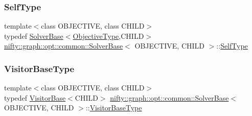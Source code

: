 \mbox{\label{classnifty_1_1graph_1_1opt_1_1common_1_1SolverBase_aeaf0e8eabef52cd3858e8c7bacc82dc6}} 
\subsubsection{\texorpdfstring{Self\+Type}{SelfType}}
{\footnotesize\ttfamily template$<$class O\+B\+J\+E\+C\+T\+I\+VE, class C\+H\+I\+LD$>$ \\
typedef \hyperlink{classnifty_1_1graph_1_1opt_1_1common_1_1SolverBase}{Solver\+Base}$<$\hyperlink{classnifty_1_1graph_1_1opt_1_1common_1_1SolverBase_aac4861a6201ba3df7ef66ad5af0c65bd}{Objective\+Type},C\+H\+I\+LD$>$ \hyperlink{classnifty_1_1graph_1_1opt_1_1common_1_1SolverBase}{nifty\+::graph\+::opt\+::common\+::\+Solver\+Base}$<$ O\+B\+J\+E\+C\+T\+I\+VE, C\+H\+I\+LD $>$\+::\hyperlink{classnifty_1_1graph_1_1opt_1_1common_1_1SolverBase_aeaf0e8eabef52cd3858e8c7bacc82dc6}{Self\+Type}}

\mbox{\label{classnifty_1_1graph_1_1opt_1_1common_1_1SolverBase_ad9932afb08dd17d375de4b15da9ffaa6}} 
\subsubsection{\texorpdfstring{Visitor\+Base\+Type}{VisitorBaseType}}
{\footnotesize\ttfamily template$<$class O\+B\+J\+E\+C\+T\+I\+VE, class C\+H\+I\+LD$>$ \\
typedef \hyperlink{classnifty_1_1graph_1_1opt_1_1common_1_1VisitorBase}{Visitor\+Base}$<$C\+H\+I\+LD$>$ \hyperlink{classnifty_1_1graph_1_1opt_1_1common_1_1SolverBase}{nifty\+::graph\+::opt\+::common\+::\+Solver\+Base}$<$ O\+B\+J\+E\+C\+T\+I\+VE, C\+H\+I\+LD $>$\+::\hyperlink{classnifty_1_1graph_1_1opt_1_1common_1_1SolverBase_ad9932afb08dd17d375de4b15da9ffaa6}{Visitor\+Base\+Type}}

